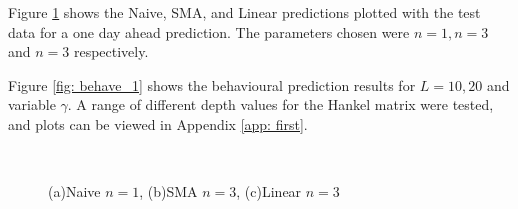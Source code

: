 \noindent Figure \ref{fig: simple_1_day} shows the Naive, SMA, and Linear predictions plotted with the test data for a one day ahead prediction. The parameters chosen were $n=1, n=3$ and $n=3$ respectively. 

\noindent Figure \ref{fig: behave_1} shows the behavioural prediction results for $L = 10, 20$ and variable $\gamma$. A range of different depth values for the Hankel matrix were tested, and plots can be viewed in Appendix \ref{app: first}. 

\begin{figure}[h!]
  \centering
  \quad
  \\
  \quad
  \caption{(a)Naive $n=1$, (b)SMA $n=3$, (c)Linear $n=3$}
  \label{fig: simple_1_day}
\end{figure}


